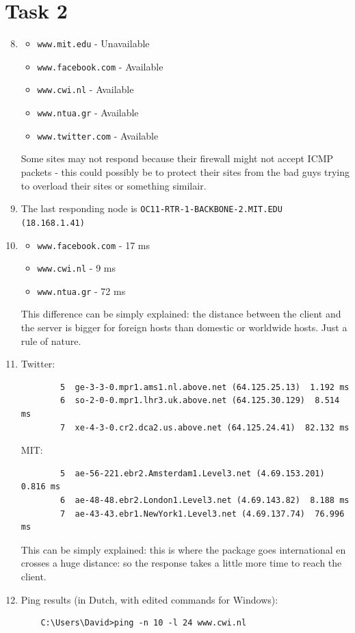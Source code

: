 \documentclass[12pt]{article}
\begin{document}
\section{Task 2}
\begin{enumerate}
	\setcounter{enumi}{7}
	\item 
	\begin{itemize}
		\item \verb|www.mit.edu| - {\color{red} Unavailable}
		\item \verb|www.facebook.com| - {\color{green} Available}
		\item \verb|www.cwi.nl| - {\color{green} Available}
		\item \verb|www.ntua.gr| - {\color{green} Available}
		\item \verb|www.twitter.com| - {\color{green} Available}
	\end{itemize}
	Some sites may not respond because their firewall might not accept ICMP packets - this could possibly be to protect their sites from the bad guys trying to overload their sites or something similair. 
	\item The last responding node is \verb|OC11-RTR-1-BACKBONE-2.MIT.EDU (18.168.1.41)|
	\item
	\begin{itemize}
		\item \verb|www.facebook.com| - 17 ms
		\item \verb|www.cwi.nl| - 9 ms
		\item \verb|www.ntua.gr| - 72 ms
	\end{itemize}
	This difference can be simply explained: the distance between the client and the server is bigger for foreign hosts than domestic or worldwide hosts. Just a rule of nature.
	\item Twitter:
	\begin{verbatim}
 		5  ge-3-3-0.mpr1.ams1.nl.above.net (64.125.25.13)  1.192 ms 
 		6  so-2-0-0.mpr1.lhr3.uk.above.net (64.125.30.129)  8.514 ms 
 		7  xe-4-3-0.cr2.dca2.us.above.net (64.125.24.41)  82.132 ms 
	\end{verbatim}
	MIT:
	\begin{verbatim}
 		5  ae-56-221.ebr2.Amsterdam1.Level3.net (4.69.153.201)  0.816 ms 
 		6  ae-48-48.ebr2.London1.Level3.net (4.69.143.82)  8.188 ms 
 		7  ae-43-43.ebr1.NewYork1.Level3.net (4.69.137.74)  76.996 ms 
	\end{verbatim}
	This can be simply explained: this is where the package goes international en crosses a huge distance: so the response takes a little more time to reach the client.
	\item Ping results (in Dutch, with edited commands for Windows):
	\begin{verbatim}
	C:\Users\David>ping -n 10 -l 24 www.cwi.nl


\end{verbatim}
\end{enumerate}
\end{document}
